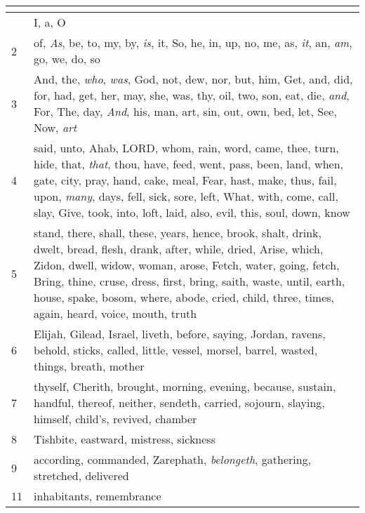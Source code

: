 \begin{center}
\begin{longtable}{l|p{3.75in}}
\hline \multicolumn{2}{c}{{ }} \\ \hline
\endfoot 
1 & I, a, O\\ \hline 
2 & of, \emph{As}, be, to, my, by, \emph{is}, it, So, he, in, up, no, me, as, \emph{it}, an, \emph{am}, go, we, do, so\\ \hline 
3 & And, the, \emph{who}, \emph{was}, God, not, dew, nor, but, him, Get, and, did, for, had, get, her, may, she, was, thy, oil, two, son, eat, die, \emph{and}, For, The, day, \emph{And}, his, man, art, sin, out, own, bed, let, See, Now, \emph{art}\\ \hline 
4 & said, unto, Ahab, LORD, whom, rain, word, came, thee, turn, hide, that, \emph{that}, thou, have, feed, went, pass, been, land, when, gate, city, pray, hand, cake, meal, Fear, hast, make, thus, fail, upon, \emph{many}, days, fell, sick, sore, left, What, with, come, call, slay, Give, took, into, loft, laid, also, evil, this, soul, down, know\\ \hline 
5 & stand, there, shall, these, years, hence, brook, shalt, drink, dwelt, bread, flesh, drank, after, while, dried, Arise, which, Zidon, dwell, widow, woman, arose, Fetch, water, going, fetch, Bring, thine, cruse, dress, first, bring, saith, waste, until, earth, house, spake, bosom, where, abode, cried, child, three, times, again, heard, voice, mouth, truth\\ \hline 
6 & Elijah, Gilead, Israel, liveth, before, saying, Jordan, ravens, behold, sticks, called, little, vessel, morsel, barrel, wasted, things, breath, mother\\ \hline 
7 & thyself, Cherith, brought, morning, evening, because, sustain, handful, thereof, neither, sendeth, carried, sojourn, slaying, himself, child's, revived, chamber\\ \hline 
8 & Tishbite, eastward, mistress, sickness\\ \hline 
9 & according, commanded, Zarephath, \emph{belongeth}, gathering, stretched, delivered\\ \hline 
11 & inhabitants, remembrance\\ \hline 
\end{longtable}
\end{center}





